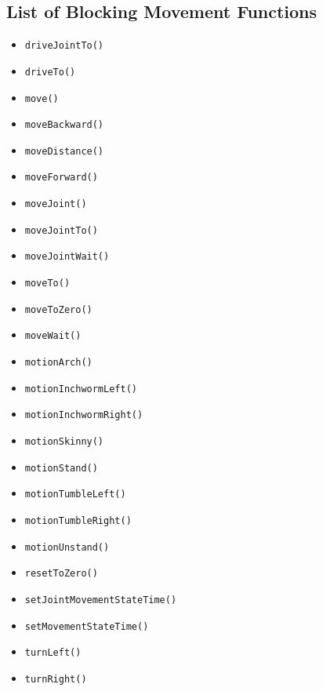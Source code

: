 \documentclass{article}
\begin{document}
\subsection{List of Blocking Movement Functions}
\begin{itemize}
\item \texttt{driveJointTo()}
\item \texttt{driveTo()}
\item \texttt{move()}
\item \texttt{moveBackward()}
\item \texttt{moveDistance()}
\item \texttt{moveForward()}
\item \texttt{moveJoint()}
\item \texttt{moveJointTo()}
\item \texttt{moveJointWait()}
\item \texttt{moveTo()}
\item \texttt{moveToZero()}
\item \texttt{moveWait()}
\item \texttt{motionArch()}
\item \texttt{motionInchwormLeft()}
\item \texttt{motionInchwormRight()}
\item \texttt{motionSkinny()}
\item \texttt{motionStand()}
\item \texttt{motionTumbleLeft()}
\item \texttt{motionTumbleRight()}
\item \texttt{motionUnstand()}
\item \texttt{resetToZero()}
\item \texttt{setJointMovementStateTime()}
\item \texttt{setMovementStateTime()}
\item \texttt{turnLeft()}
\item \texttt{turnRight()}
\end{itemize}
\end{document}
